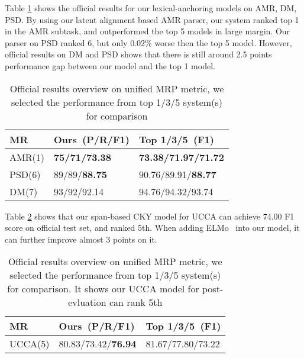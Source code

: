 Table \ref{tbl:results_rank} shows the official results for our
lexical-anchoring models on AMR, DM, PSD.  By using our latent
alignment based AMR parser, our system ranked top 1 in the AMR subtask,
and outperformed the top 5 models in large margin. Our parser on PSD
ranked 6, but only 0.02\% worse then the top 5 model. However, official
results on DM and PSD shows that there is still around 2.5 points
performance gap between our model and the top 1 model.

\begin{table}[!h]
\small
\centering
\begin{tabular}{lll}
\toprule
MR     & Ours~(P/R/F1) & Top 1/3/5~(F1)  \\ \hline
AMR(1) & {\bf 75/71/73.38}   & {\bf 73.38/71.97/71.72} \\
PSD(6) & 89/89/{\bf 88.75}   & 90.76/89.91/{\bf 88.77} \\
DM(7)  & 93/92/92.14   & 94.76/94.32/93.74 \\ \hline
\end{tabular}
\caption{\label{tbl:results_rank} Official results overview on unified MRP metric, we selected the performance from top 1/3/5 system(s) for comparison}
\end{table}

 Table
\ref{tbl:ucca_results_rank} shows that our span-based CKY model for
UCCA can achieve 74.00 F1 score on official test set, and ranked
5th. When adding ELMo~\cite{peters2018deep} into our model, it can further improve almost 3
points on it.
\begin{table}[!h]
  \small
\centering
\begin{tabular}{lll}
\toprule
MR     & Ours~(P/R/F1) & Top 1/3/5~(F1)  \\ \hline
UCCA(5)   & 80.83/73.42/\textbf{76.94}   & 81.67/77.80/73.22 \\
\end{tabular}
\caption{\label{tbl:ucca_results_rank} Official results overview on
  unified MRP metric, we selected the performance from top 1/3/5
  system(s) for comparison. It shows our UCCA model for post-evluation
  can rank 5th}
\end{table}


